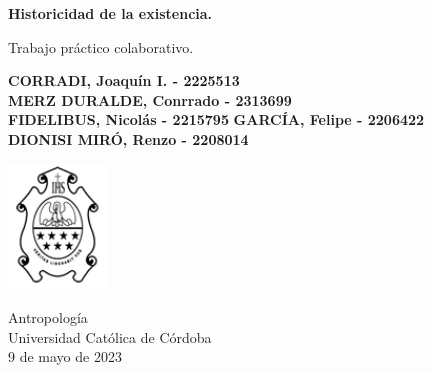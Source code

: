 \begin{titlepage}
    \begin{center}
        \vspace*{1cm}
            
        \Huge
        \textbf{Historicidad de la existencia.}
            
        \vspace{0.5cm}
        \LARGE
        Trabajo práctico colaborativo.
            
        \vspace{1.5cm}
            
        \textbf{CORRADI, Joaquín I. - 2225513}\\
        \textbf{MERZ DURALDE, Conrrado - 2313699}\\
        \textbf{FIDELIBUS, Nicolás - 2215795}
        \textbf{GARCÍA, Felipe - 2206422}\\
        \textbf{DIONISI MIRÓ, Renzo - 2208014}
            
        \vfill
            
        \vspace{0.8cm}
            
        \includegraphics[width=0.2\textwidth]{logoucc.png}
            
        \Large
        Antropología\\
        Universidad Católica de Córdoba\\
        9 de mayo de 2023
            
    \end{center}
\end{titlepage}

